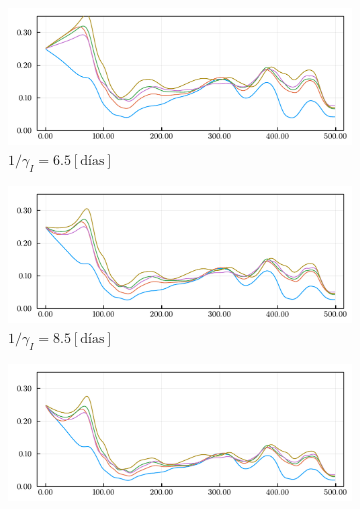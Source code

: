 \begin{figure}[H]
     \centering
     \begin{subfigure}[b]{.47\textwidth}
         \centering
         \includegraphics[width=\textwidth]{img/resultados/sensigammai_6-5_0alphaini0-15_0-1_0-45_high1__acov0-8_aini0-27675_gcov0-05gamma_e_0-1724_gamma_i_0-1389_beta_2_2-0000.pdf}
         \caption{\(1/\gamma_I = 6.5 [\text{días}]\)}
     \end{subfigure}
     \hfill
     \begin{subfigure}[b]{0.47\textwidth}
         \centering
         \includegraphics[width=\textwidth]{img/resultados/sensigammai_8-5_0alphaini0-15_0-1_0-45_high1__acov0-8_aini0-27675_gcov0-05gamma_e_0-1724_gamma_i_0-1389_beta_2_2-0000.pdf}
         \caption{\(1/\gamma_I = 8.5 [\text{días}]\)}
     \end{subfigure}
     \hfill
     \begin{subfigure}[b]{.47\textwidth}
         \centering
         \includegraphics[width=\textwidth]{img/resultados/sensigammai_10-5_0alphaini0-15_0-1_0-45_high1__acov0-8_aini0-27675_gcov0-05gamma_e_0-1724_gamma_i_0-1389_beta_2_2-0000.pdf}

\end{subfigure}
\end{figure}
